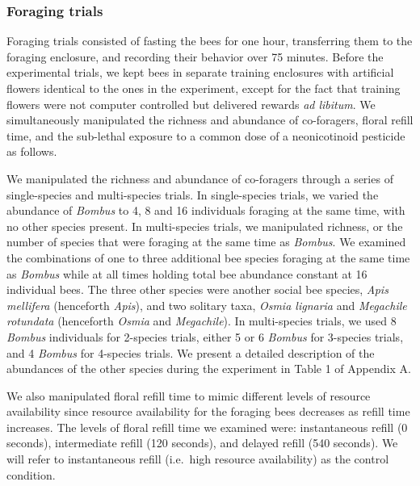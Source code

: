 \begin{refsection}
\subsubsection*{Foraging trials}

Foraging trials consisted of fasting the bees for one hour, transferring them to the foraging enclosure, and recording their behavior over 75 minutes. Before the experimental trials, we kept bees in separate training enclosures with artificial flowers identical to the ones in the experiment, except for the fact that training flowers were not computer controlled but delivered rewards \textit{ad libitum}. We simultaneously manipulated the richness and abundance of co-foragers, floral refill time, and the sub-lethal exposure to a common dose of a neonicotinoid pesticide as follows.

We manipulated the richness and abundance of co-foragers through a series of single-species and multi-species trials. In single-species trials, we varied the abundance of \textit{Bombus} to 4, 8 and 16 individuals foraging at the same time, with no other species present. In multi-species trials, we manipulated richness, or the number of species that were foraging at the same time as \textit{Bombus}. We examined the combinations of one to three additional bee species foraging at the same time as \textit{Bombus} while at all times holding total bee abundance constant at 16 individual bees. The three other species were another social bee species, \textit{Apis mellifera} (henceforth \textit{Apis}), and two solitary taxa, \textit{Osmia lignaria} and \textit{Megachile rotundata} (henceforth \textit{Osmia} and \textit{Megachile}). In multi-species trials, we used 8 \textit{Bombus} individuals for 2-species trials, either 5 or 6 \textit{Bombus} for 3-species trials, and 4 \textit{Bombus} for 4-species trials. We present a detailed description of the abundances of the other species during the experiment in Table 1 of Appendix A.

We also manipulated floral refill time to mimic different levels of resource availability since resource availability for the foraging bees decreases as refill time increases. The levels of floral refill time we examined were: instantaneous refill (0 seconds), intermediate refill (120 seconds), and delayed refill (540 seconds). We will refer to instantaneous refill (i.e.\ high resource availability) as the control condition.


\end{refsection}
